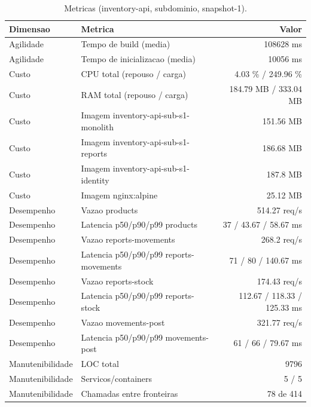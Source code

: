 \begin{table}[htb]
  \centering
  \caption{Metricas (inventory-api, subdominio, snapshot-1).}
  \label{tab:metricas-inventory-api-subdominio-snapshot-1}
  \begin{tabular}{llr}
    \hline
    \textbf{Dimensao} & \textbf{Metrica} & \textbf{Valor} \\
    \hline
    Agilidade & Tempo de build (media) & 108628 ms \\
    Agilidade & Tempo de inicializacao (media) & 10056 ms \\
    Custo & CPU total (repouso / carga) & 4.03 \% / 249.96 \% \\
    Custo & RAM total (repouso / carga) & 184.79 MB / 333.04 MB \\
    Custo & Imagem inventory-api-sub-s1-monolith & 151.56 MB \\
    Custo & Imagem inventory-api-sub-s1-reports & 186.68 MB \\
    Custo & Imagem inventory-api-sub-s1-identity & 187.8 MB \\
    Custo & Imagem nginx:alpine & 25.12 MB \\
    Desempenho & Vazao products & 514.27 req/s \\
    Desempenho & Latencia p50/p90/p99 products & 37 / 43.67 / 58.67 ms \\
    Desempenho & Vazao reports-movements & 268.2 req/s \\
    Desempenho & Latencia p50/p90/p99 reports-movements & 71 / 80 / 140.67 ms \\
    Desempenho & Vazao reports-stock & 174.43 req/s \\
    Desempenho & Latencia p50/p90/p99 reports-stock & 112.67 / 118.33 / 125.33 ms \\
    Desempenho & Vazao movements-post & 321.77 req/s \\
    Desempenho & Latencia p50/p90/p99 movements-post & 61 / 66 / 79.67 ms \\
    Manutenibilidade & LOC total & 9796 \\
    Manutenibilidade & Servicos/containers & 5 / 5 \\
    Manutenibilidade & Chamadas entre fronteiras & 78 de 414 \\
    \hline
  \end{tabular}
\end{table}
